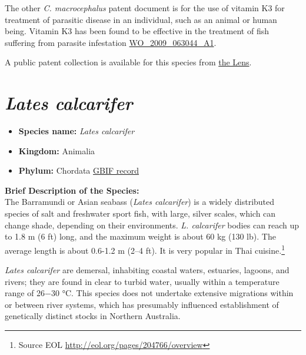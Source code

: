 \documentclass[]{book}
\providecommand{\tightlist}{%
  \setlength{\itemsep}{0pt}\setlength{\parskip}{0pt}}
\let\rmarkdownfootnote\footnote%
\def\footnote{\protect\rmarkdownfootnote}
\theoremstyle{definition}
\theoremstyle{definition}
\theoremstyle{definition}
\theoremstyle{remark}
\begin{document}
The other \emph{C. macrocephalus} patent document is for the use of
vitamin K3 for treatment of parasitic disease in an individual, such as
an animal or human being. Vitamin K3 has been found to be effective in
the treatment of fish suffering from parasite infestation
\href{https://www.lens.org/lens/patent/WO_2009_063044_A1}{WO\_2009\_063044\_A1}.

A public patent collection is available for this species from
\href{https://www.lens.org/lens/collection/24937}{the Lens}.

\hypertarget{lates-calcarifer}{%
\section{\texorpdfstring{\emph{Lates
calcarifer}}{Lates calcarifer}}\label{lates-calcarifer}}

\begin{itemize}
\tightlist
\item
  \textbf{Species name:} \emph{Lates calcarifer}
\item
  \textbf{Kingdom:} Animalia
\item
  \textbf{Phylum:} Chordata
  \href{https://www.gbif.org/species/2223871}{GBIF record}
\end{itemize}

\textbf{Brief Description of the Species:}\\
The Barramundi or Asian seabass (\emph{Lates calcarifer}) is a widely
distributed species of salt and freshwater sport fish, with large,
silver scales, which can change shade, depending on their environments.
\emph{L. calcarifer} bodies can reach up to 1.8 m (6 ft) long, and the
maximum weight is about 60 kg (130 lb). The average length is about
0.6-1.2 m (2--4 ft). It is very popular in Thai cuisine.\footnote{Source
  EOL \url{http://eol.org/pages/204766/overview}}

\emph{Lates calcarifer} are demersal, inhabiting coastal waters,
estuaries, lagoons, and rivers; they are found in clear to turbid water,
usually within a temperature range of 26−30 °C. This species does not
undertake extensive migrations within or between river systems, which
has presumably influenced establishment of genetically distinct stocks
in Northern Australia.
\end{document}
